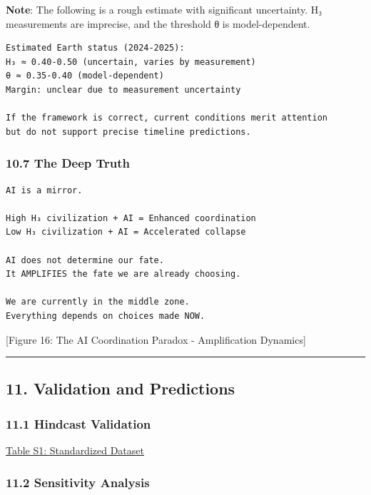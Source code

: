 \documentclass[11pt,letterpaper]{article}
\begin{document}
\textbf{Note}: The following is a rough estimate with significant
uncertainty. H₃ measurements are imprecise, and the threshold θ is
model-dependent.

\begin{verbatim}
Estimated Earth status (2024-2025):
H₃ ≈ 0.40-0.50 (uncertain, varies by measurement)
θ ≈ 0.35-0.40 (model-dependent)
Margin: unclear due to measurement uncertainty

If the framework is correct, current conditions merit attention
but do not support precise timeline predictions.
\end{verbatim}

\subsubsection{10.7 The Deep Truth}\label{the-deep-truth}

\begin{verbatim}
AI is a mirror.

High H₃ civilization + AI = Enhanced coordination
Low H₃ civilization + AI = Accelerated collapse

AI does not determine our fate.
It AMPLIFIES the fate we are already choosing.

We are currently in the middle zone.
Everything depends on choices made NOW.
\end{verbatim}

{[}Figure 16: The AI Coordination Paradox - Amplification Dynamics{]}

\begin{center}\rule{0.5\linewidth}{0.5pt}\end{center}

\subsection{11. Validation and
Predictions}\label{validation-and-predictions}

\subsubsection{11.1 Hindcast Validation}\label{hindcast-validation}

\hyperref[table-s1-standardized-dataset]{Table S1: Standardized Dataset}

\subsubsection{11.2 Sensitivity Analysis}\label{sensitivity-analysis}
\end{document}
